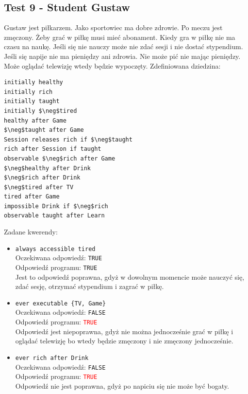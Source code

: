 \documentclass{article}
\begin{document}
\subsection{Test 9 - Student Gustaw}
Gustaw jest piłkarzem. Jako sportowiec ma dobre zdrowie. Po meczu jest zmęczony. Żeby grać w piłkę musi mieć abonament. Kiedy gra w piłkę nie ma czasu na naukę. Jeśli się nie nauczy może nie zdać sesji i nie dostać stypendium. Jeśli się napije nie ma pieniędzy ani zdrowia. Nie może pić nie mając pieniędzy. Może oglądać telewizję wtedy będzie wypoczęty.
Zdefiniowana dziedzina:
\begin{lstlisting}[mathescape=true]
initially healthy
initially rich
initially taught
initially $\neg$tired
healthy after Game
$\neg$taught after Game
Session releases rich if $\neg$taught
rich after Session if taught
observable $\neg$rich after Game
$\neg$healthy after Drink
$\neg$rich after Drink
$\neg$tired after TV
tired after Game
impossible Drink if $\neg$rich
observable taught after Learn
\end{lstlisting}
Zadane kwerendy:
\begin{itemize}
    \item {\large\texttt{always accessible tired}}\\
	Oczekiwana odpowiedź: \texttt{TRUE}\\
    Odpowiedź programu: \texttt{TRUE}\\
    Jest to odpowiedź poprawna, gdyż w dowolnym momencie może nauczyć się, zdać sesję, otrzymać stypendium i zagrać w piłkę.
	
    \item {\large\texttt{ever executable \{TV, Game\}}}\\
	Oczekiwana odpowiedź: \texttt{FALSE}\\
    Odpowiedź programu: \textcolor{red}{\texttt{TRUE}}\\
    Odpowiedź jest niepoprawna, gdyż nie można jednocześnie grać w piłkę i oglądać telewizję bo wtedy będzie zmęczony i nie zmęczony jednocześnie.

	\item {\large\texttt{ever rich after Drink}}\\
	Oczekiwana odpowiedź: \texttt{FALSE}\\
	Odpowiedź programu: \textcolor{red}{\texttt{TRUE}}\\
    Odpowiedź nie jest poprawna, gdyż po napiciu się nie może być bogaty.

\end{itemize}
\newpage
\end{document}
